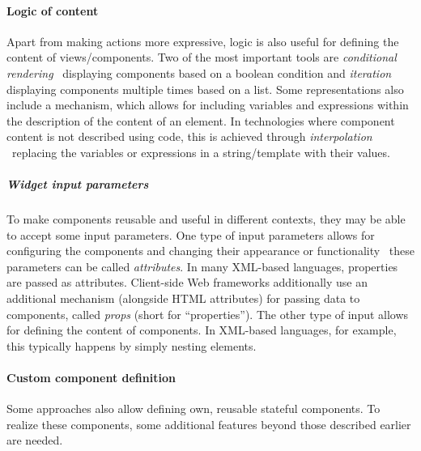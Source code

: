 \paragraph{Logic of content}
Apart from making actions more expressive, logic is also useful for defining the content of views/components.
Two of the most important tools are \emph{conditional rendering} \textendash\ displaying components based on a boolean condition and \emph{iteration} displaying components multiple times based on a list.
Some representations also include a mechanism, which allows for including variables and expressions within the description of the content of an element.
In technologies where component content is not described using code, this is achieved through \emph{interpolation} \textendash\ replacing the variables or expressions in a string/template with their values.

\subparagraph{Widget input parameters}
To make components reusable and useful in different contexts, they may be able to accept some input parameters.
One type of input parameters allows for configuring the components and changing their appearance or functionality \textendash\ these parameters can be called \emph{attributes}.
In many XML-based languages, properties are passed as attributes.
Client-side Web frameworks additionally use an additional mechanism (alongside HTML attributes) for passing data to components, called \emph{props} (short for \enquote{properties}).
The other type of input allows for defining the content of components.
In XML-based languages, for example, this typically happens by simply nesting elements.

\paragraph{Custom component definition}
Some approaches also allow defining own, reusable stateful components.
To realize these components, some additional features beyond those described earlier are needed.

